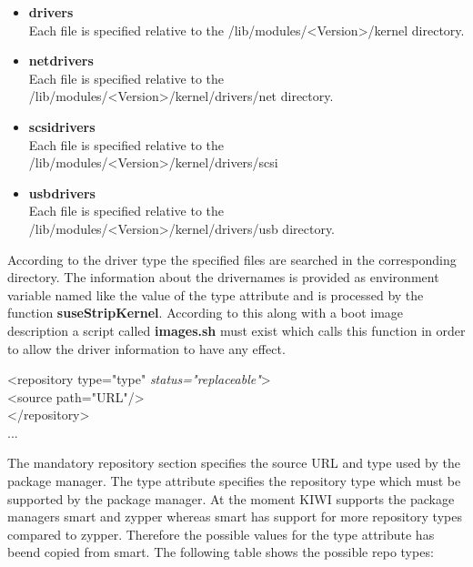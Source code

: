 \begin{itemize}
\item \textbf{drivers}\\
      Each file is specified relative to the
      /lib/modules/<Version>/kernel directory.
\item \textbf{netdrivers}\\
      Each file is specified relative to the
      /lib/modules/<Version>/kernel/drivers/net
      directory.
\item \textbf{scsidrivers}\\
      Each file is specified relative to the
      /lib/modules/<Version>/kernel/drivers/scsi
\item \textbf{usbdrivers}\\
      Each file is specified relative to the
      /lib/modules/<Version>/kernel/drivers/usb directory.
\end{itemize}

According to the driver type the specified files are searched in
the corresponding directory. The information about the drivernames
is provided as environment variable named like the value of
the type attribute and is processed by the function
\textbf{suseStripKernel}. According to this along with a boot image
description a script called \textbf{images.sh} must exist which
calls this function in order to allow the driver information to
have any effect.


\begin{Command}{12cm}
<repository type="type" \textit{status="replaceable"}>\\
\hspace*{1cm}<source path="URL"/>\\
</repository>\\
...
\end{Command}

The mandatory repository section specifies the source URL and
type used by the package manager. The type attribute specifies the
repository type which must be supported by the package manager.
At the moment KIWI supports the package managers smart and zypper
whereas smart has support for more repository types compared to
zypper. Therefore the possible values for the type attribute has
beend copied from smart. The following table shows the possible
repo types: 


